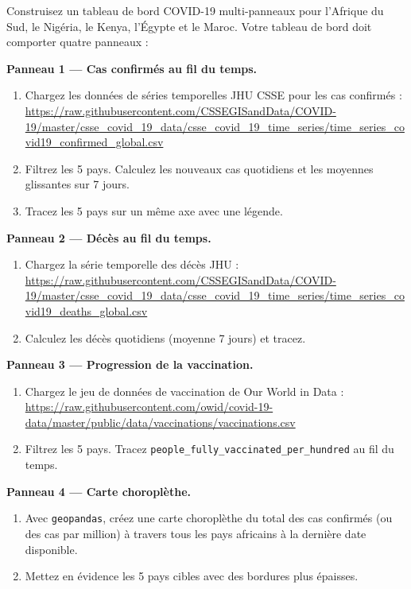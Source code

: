 \begin{exercise}
Construisez un tableau de bord COVID-19 multi-panneaux pour l'Afrique du Sud, le Nig\'eria, le Kenya, l'\'Egypte et le Maroc. Votre tableau de bord doit comporter quatre panneaux :

\textbf{Panneau 1 --- Cas confirm\'es au fil du temps.}
\begin{enumerate}
  \item Chargez les donn\'ees de s\'eries temporelles JHU CSSE pour les cas confirm\'es :\\
  \url{https://raw.githubusercontent.com/CSSEGISandData/COVID-19/master/csse_covid_19_data/csse_covid_19_time_series/time_series_covid19_confirmed_global.csv}
  \item Filtrez les 5 pays. Calculez les nouveaux cas quotidiens et les moyennes glissantes sur 7 jours.
  \item Tracez les 5 pays sur un m\^eme axe avec une l\'egende.
\end{enumerate}

\textbf{Panneau 2 --- D\'ec\`es au fil du temps.}
\begin{enumerate}
  \item Chargez la s\'erie temporelle des d\'ec\`es JHU :\\
  \url{https://raw.githubusercontent.com/CSSEGISandData/COVID-19/master/csse_covid_19_data/csse_covid_19_time_series/time_series_covid19_deaths_global.csv}
  \item Calculez les d\'ec\`es quotidiens (moyenne 7 jours) et tracez.
\end{enumerate}

\textbf{Panneau 3 --- Progression de la vaccination.}
\begin{enumerate}
  \item Chargez le jeu de donn\'ees de vaccination de Our World in Data :\\
  \url{https://raw.githubusercontent.com/owid/covid-19-data/master/public/data/vaccinations/vaccinations.csv}
  \item Filtrez les 5 pays. Tracez \texttt{people\_fully\_vaccinated\_per\_hundred} au fil du temps.
\end{enumerate}

\textbf{Panneau 4 --- Carte choropl\`ethe.}
\begin{enumerate}
  \item Avec \texttt{geopandas}, cr\'eez une carte choropl\`ethe du total des cas confirm\'es (ou des cas par million) \`a travers tous les pays africains \`a la derni\`ere date disponible.
  \item Mettez en \'evidence les 5 pays cibles avec des bordures plus \'epaisses.
\end{enumerate}


\end{exercise}
